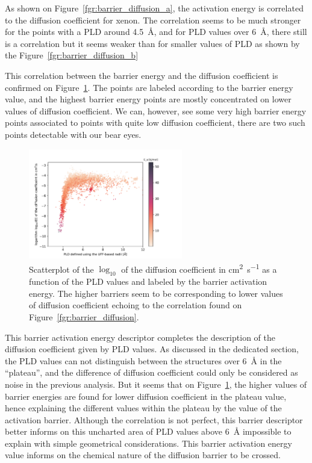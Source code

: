 \documentclass[main]{subfiles}
\begin{document}
As shown on Figure~\ref{fgr:barrier_diffusion_a}, the activation energy is correlated to the diffusion coefficient for xenon. The correlation seems to be much stronger for the points with a PLD around \SI{4.5}{\angstrom}, and for PLD values over \SI{6}{\angstrom}, there still is a correlation but it seems weaker than for smaller values of PLD as shown by the Figure~\ref{fgr:barrier_diffusion_b}

This correlation between the barrier energy and the diffusion coefficient is confirmed on Figure~\ref{fgr:diff_pld_barrier}. The points are labeled according to the barrier energy value, and the highest barrier energy points are mostly concentrated on lower values of diffusion coefficient. We can, however, see some very high barrier energy points associated to points with quite low diffusion coefficient, there are two such points detectable with our bear eyes. 

\begin{figure}[ht]
  \centering
    \includegraphics[width=0.6\textwidth]{figures/5-diffusion/difflog_Df-uff298K_barrier.pdf}
    \caption{ Scatterplot of the $\log_{10}$ of the diffusion coefficient in \si{\square\cm\per\s} as a function of the PLD values and labeled by the barrier activation energy. The higher barriers seem to be corresponding to lower values of diffusion coefficient echoing to the correlation found on Figure~\ref{fgr:barrier_diffusion}.}\label{fgr:diff_pld_barrier}
\end{figure}

This barrier activation energy descriptor completes the description of the diffusion coefficient given by PLD values. As discussed in the dedicated section, the PLD values can not distinguish between the structures over \SI{6}{\angstrom} in the ``plateau'', and the difference of diffusion coefficient could only be considered as noise in the previous analysis. But it seems that on Figure~\ref{fgr:diff_pld_barrier}, the higher values of barrier energies are found for lower diffusion coefficient in the plateau value, hence explaining the different values within the plateau by the value of the activation barrier. 
Although the correlation is not perfect, this barrier descriptor better informs on this uncharted area of PLD values above \SI{6}{\angstrom} impossible to explain with simple geometrical considerations. This barrier activation energy value informs on the chemical nature of the diffusion barrier to be crossed. 
\end{document}
